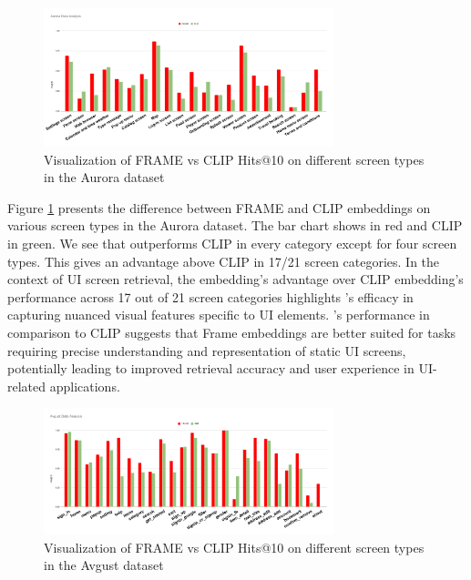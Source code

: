 \begin{figure}[h]
    \centering
    \includegraphics[width=0.75\textwidth]{imgs/AuroraCase.pdf}
    \caption{Visualization of FRAME vs CLIP Hits@10 on different screen types in the Aurora dataset}
    \label{fig:AuroraCase}
\end{figure}

Figure \ref{fig:AuroraCase} presents the difference between FRAME and CLIP embeddings on various screen types in the Aurora dataset. The bar chart shows \FRAME in red and CLIP in green. We see that \FRAME outperforms CLIP in every category except for four screen types. This gives \FRAME an advantage above CLIP in 17/21 screen categories. In the context of UI screen retrieval, the \FRAME embedding's advantage over CLIP embedding's performance across 17 out of 21 screen categories highlights \FRAME 's efficacy in capturing nuanced visual features specific to UI elements. \FRAME's performance in comparison to CLIP suggests that Frame embeddings are better suited for tasks requiring precise understanding and representation of static UI screens, potentially leading to improved retrieval accuracy and user experience in UI-related applications. 

\begin{figure}[h]
    \centering
    \includegraphics[width=0.75\textwidth]{imgs/AvgustCase.pdf}
    \caption{Visualization of FRAME vs CLIP Hits@10 on different screen types in the Avgust dataset}
    \label{fig:AvgustCase}    
\end{figure}

